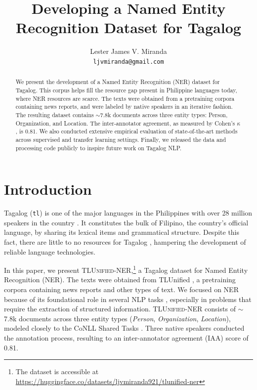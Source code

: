\documentclass[11pt]{article}
\title{Developing a Named Entity Recognition Dataset for Tagalog}
\author{Lester James V. Miranda \\
  \texttt{ljvmiranda@gmail.com} \\}
\begin{document}
\newcommand{\tlunified}{\textsc{TLUnified-NER}}

\maketitle
\begin{abstract}
  We present the development of a Named Entity Recognition (NER) dataset for Tagalog.
  This corpus helps fill the resource gap present in Philippine languages today, where NER resources are scarce.
  The texts were obtained from a pretraining corpora containing news reports, and were labeled by native speakers in an iterative fashion.
  The resulting dataset contains $\sim$7.8k documents across three entity types: Person, Organization, and Location.
  The inter-annotator agreement, as measured by Cohen's $\kappa$, is 0.81.
  We also conducted extensive empirical evaluation of state-of-the-art methods across supervised and transfer learning settings.
  Finally, we released the data and processing code publicly to inspire future work on Tagalog NLP.
\end{abstract}

\section{Introduction}

Tagalog (\texttt{tl}) is one of the major languages in the Philippines with over 28 million speakers in the country \cite{Lewis2009EthnologueL}. 
It constitutes the bulk of Filipino, the country's official language, by sharing its lexical items and grammatical structure.
Despite this fact, there are little to no resources for Tagalog \cite{Cruz2021ImprovingLL}, hampering the development of reliable language technologies.

In this paper, we present \tlunified{},\footnote[1]{The dataset is accessible at \url{https://huggingface.co/datasets/ljvmiranda921/tlunified-ner}} a Tagalog dataset for Named Entity Recognition (NER).
The texts were obtained from TLUnified \cite{Cruz2021ImprovingLL}, a pretraining corpora containing news reports and other types of text.
We focused on NER because of its foundational role in several NLP tasks \citep{Sang2003IntroductionTT,Lample2016NeuralAF}, especially in problems that require the extraction of structured information. 
\tlunified{} consists of $\sim$7.8k documents across three entity types (\textit{Person}, \textit{Organization}, \textit{Location}), modeled closely to the CoNLL Shared Tasks \cite{Sang2002IntroductionTT,Sang2003IntroductionTT}.
Three native speakers conducted the annotation process, resulting to an inter-annotator agreement (IAA) score of 0.81.
\end{document}
